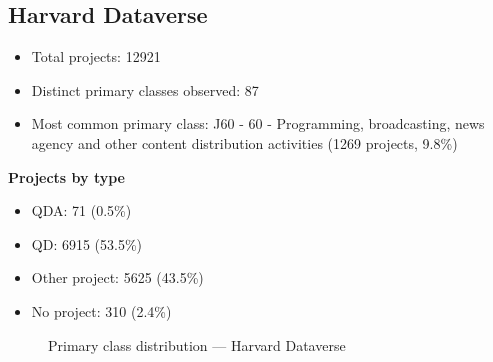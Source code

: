 \subsection{Harvard Dataverse}

\begin{itemize}
    \item Total projects: 12921
    \item Distinct primary classes observed: 87
    \item Most common primary class: J60 - 60 - Programming, broadcasting, news agency and other content distribution activities (1269 projects, 9.8\%)
\end{itemize}
\textbf{Projects by type}
\begin{itemize}
    \item QDA: 71 (0.5\%)
    \item QD: 6915 (53.5\%)
    \item Other project: 5625 (43.5\%)
    \item No project: 310 (2.4\%)
\end{itemize}

\begin{figure}[h]
    \centering
    
    \caption{Primary class distribution --- Harvard Dataverse}
\end{figure}

